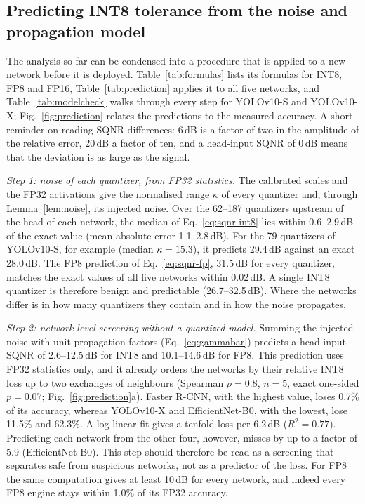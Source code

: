 \documentclass[pdflatex,sn-mathphys-num]{sn-jnl}%
\theoremstyle{thmstyleone}%
\theoremstyle{thmstyletwo}%
\theoremstyle{thmstylethree}%
\begin{document}
\subsection{Predicting INT8 tolerance from the noise and propagation model}\label{sec:worked}
The analysis so far can be condensed into a procedure that is applied to a new network before it is deployed. Table~\ref{tab:formulas} lists its formulas for INT8, FP8 and FP16, Table~\ref{tab:prediction} applies it to all five networks, and Table~\ref{tab:modelcheck} walks through every step for YOLOv10-S and YOLOv10-X; Fig.~\ref{fig:prediction} relates the predictions to the measured accuracy. A short reminder on reading SQNR differences: 6\,dB is a factor of two in the amplitude of the relative error, 20\,dB a factor of ten, and a head-input SQNR of 0\,dB means that the deviation is as large as the signal.

\emph{Step 1: noise of each quantizer, from FP32 statistics.} The calibrated scales and the FP32 activations give the normalised range $\kappa$ of every quantizer and, through Lemma~\ref{lem:noise}, its injected noise. Over the 62--187 quantizers upstream of the head of each network, the median of Eq.~\eqref{eq:sqnr-int8} lies within 0.6--2.9\,dB of the exact value (mean absolute error 1.1--2.8\,dB). For the 79 quantizers of YOLOv10-S, for example (median $\kappa=15.3$), it predicts 29.4\,dB against an exact 28.0\,dB. The FP8 prediction of Eq.~\eqref{eq:sqnr-fp}, 31.5\,dB for every quantizer, matches the exact values of all five networks within 0.02\,dB. A single INT8 quantizer is therefore benign and predictable (26.7--32.5\,dB). Where the networks differ is in how many quantizers they contain and in how the noise propagates.

\emph{Step 2: network-level screening without a quantized model.} Summing the injected noise with unit propagation factors (Eq.~\eqref{eq:gammabar}) predicts a head-input SQNR of 2.6--12.5\,dB for INT8 and 10.1--14.6\,dB for FP8. This prediction uses FP32 statistics only, and it already orders the networks by their relative INT8 loss up to two exchanges of neighbours (Spearman $\rho=0.8$, $n=5$, exact one-sided $p=0.07$; Fig.~\ref{fig:prediction}a). Faster R-CNN, with the highest value, loses 0.7\% of its accuracy, whereas YOLOv10-X and EfficientNet-B0, with the lowest, lose 11.5\% and 62.3\%. A log-linear fit gives a tenfold loss per 6.2\,dB ($R^2=0.77$). Predicting each network from the other four, however, misses by up to a factor of 5.9 (EfficientNet-B0). This step should therefore be read as a screening that separates safe from suspicious networks, not as a predictor of the loss. For FP8 the same computation gives at least 10\,dB for every network, and indeed every FP8 engine stays within 1.0\% of its FP32 accuracy.
\end{document}
